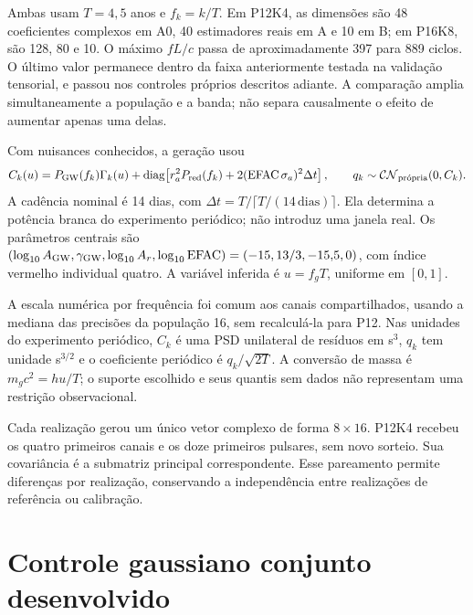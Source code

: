 Ambas usam $T=4{,}5$ anos e $f_k=k/T$. Em P12K4, as dimensões são 48 coeficientes complexos em A0, 40 estimadores reais em A e 10 em B; em P16K8, são 128, 80 e 10. O máximo $fL/c$ passa de aproximadamente 397 para 889 ciclos. O último valor permanece dentro da faixa anteriormente testada na validação tensorial, e passou nos controles próprios descritos adiante. A comparação amplia simultaneamente a população e a banda; não separa causalmente o efeito de aumentar apenas uma delas.

Com nuisances conhecidos, a geração usou
\begin{equation}
 C_k(u)=P_{\rm GW}(f_k)\Gamma_k(u)+
 \operatorname{diag}\!\left[r_a^2P_{\rm red}(f_k)+2(\mathrm{EFAC}\,\sigma_a)^2\Delta t\right],
 \qquad q_k\sim\mathcal{CN}_{\rm pr\acute opria}(0,C_k).
\end{equation}
A cadência nominal é 14 dias, com $\Delta t=T/\lceil T/(14\,\mathrm{dias})\rceil$. Ela determina a potência branca do experimento periódico; não introduz uma janela real. Os parâmetros centrais são $(\log_{10}A_{\rm GW},\gamma_{\rm GW},\log_{10}A_r,\log_{10}\mathrm{EFAC})=(-15,13/3,-15{,}5,0)$, com índice vermelho individual quatro. A variável inferida é $u=f_gT$, uniforme em $[0,1]$.

A escala numérica por frequência foi comum aos canais compartilhados, usando a mediana das precisões da população 16, sem recalculá-la para P12. Nas unidades do experimento periódico, $C_k$ é uma PSD unilateral de resíduos em s$^3$, $q_k$ tem unidade s$^{3/2}$ e o coeficiente periódico é $q_k/\sqrt{2T}$. A conversão de massa é $m_gc^2=hu/T$; o suporte escolhido e seus quantis sem dados não representam uma restrição observacional.

Cada realização gerou um único vetor complexo de forma $8\times16$. P12K4 recebeu os quatro primeiros canais e os doze primeiros pulsares, sem novo sorteio. Sua covariância é a submatriz principal correspondente. Esse pareamento permite diferenças por realização, conservando a independência entre realizações de referência ou calibração.

\section{Controle gaussiano conjunto desenvolvido}

